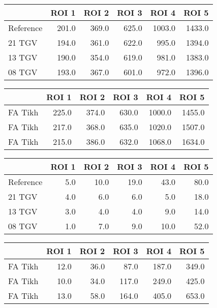 \begin{tabular}{lrrrrr}
\toprule
{} &  ROI 1 &  ROI 2 &  ROI 3 &   ROI 4 &   ROI 5 \\
\midrule
Reference &  201.0 &  369.0 &  625.0 &  1003.0 &  1433.0 \\
21 TGV    &  194.0 &  361.0 &  622.0 &   995.0 &  1394.0 \\
13 TGV    &  190.0 &  354.0 &  619.0 &   981.0 &  1383.0 \\
08 TGV    &  193.0 &  367.0 &  601.0 &   972.0 &  1396.0 \\
\bottomrule
\end{tabular}
\begin{tabular}{lrrrrr}
\toprule
{} &  ROI 1 &  ROI 2 &  ROI 3 &   ROI 4 &   ROI 5 \\
\midrule
FA Tikh &  225.0 &  374.0 &  630.0 &  1000.0 &  1455.0 \\
FA Tikh &  217.0 &  368.0 &  635.0 &  1020.0 &  1507.0 \\
FA Tikh &  215.0 &  386.0 &  632.0 &  1068.0 &  1634.0 \\
\bottomrule
\end{tabular}
\begin{tabular}{lrrrrr}
\toprule
{} &  ROI 1 &  ROI 2 &  ROI 3 &  ROI 4 &  ROI 5 \\
\midrule
Reference &    5.0 &   10.0 &   19.0 &   43.0 &   80.0 \\
21 TGV    &    4.0 &    6.0 &    6.0 &    5.0 &   18.0 \\
13 TGV    &    3.0 &    4.0 &    4.0 &    9.0 &   14.0 \\
08 TGV    &    1.0 &    7.0 &    9.0 &   10.0 &   52.0 \\
\bottomrule
\end{tabular}
\begin{tabular}{lrrrrr}
\toprule
{} &  ROI 1 &  ROI 2 &  ROI 3 &  ROI 4 &  ROI 5 \\
\midrule
FA Tikh &   12.0 &   36.0 &   87.0 &  187.0 &  349.0 \\
FA Tikh &   10.0 &   34.0 &  117.0 &  249.0 &  425.0 \\
FA Tikh &   13.0 &   58.0 &  164.0 &  405.0 &  653.0 \\
\bottomrule
\end{tabular}

